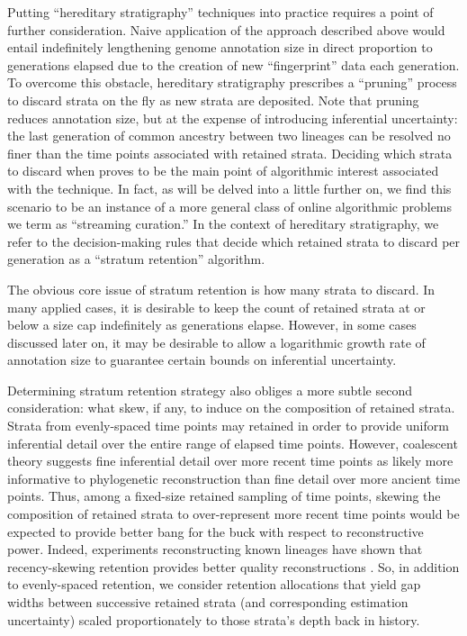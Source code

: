 Putting ``hereditary stratigraphy'' techniques into practice requires a point of further consideration.
Naive application of the approach described above would entail indefinitely lengthening genome annotation size in direct proportion to generations elapsed due to the creation of new ``fingerprint'' data each generation.
To overcome this obstacle, hereditary stratigraphy prescribes a ``pruning'' process to discard strata on the fly as new strata are deposited.
Note that pruning reduces annotation size, but at the expense of introducing inferential uncertainty: the last generation of common ancestry between two lineages can be resolved no finer than the time points associated with retained strata.
Deciding which strata to discard when proves to be the main point of algorithmic interest associated with the technique.
In fact, as will be delved into a little further on, we find this scenario to be an instance of a more general class of online algorithmic problems we term as ``streaming curation.''
In the context of hereditary stratigraphy, we refer to the decision-making rules that decide which retained strata to discard per generation as a ``stratum retention'' algorithm.

The obvious core issue of stratum retention is how many strata to discard.
In many applied cases, it is desirable to keep the count of retained strata at or below a size cap indefinitely as generations elapse.
However, in some cases discussed later on, it may be desirable to allow a logarithmic growth rate of annotation size to guarantee certain bounds on inferential uncertainty.

Determining stratum retention strategy also obliges a more subtle second consideration: what skew, if any, to induce on the composition of retained strata.
Strata from evenly-spaced time points may retained in order to provide uniform inferential detail over the entire range of elapsed time points.
However, coalescent theory suggests fine inferential detail over more recent time points as likely more informative to phylogenetic reconstruction than fine detail over more ancient time points.
Thus, among a fixed-size retained sampling of time points, skewing the composition of retained strata to over-represent more recent time points would be expected to provide better bang for the buck with respect to reconstructive power.
Indeed, experiments reconstructing known lineages have shown that recency-skewing retention provides better quality reconstructions \citep{moreno2022hereditary}.
So, in addition to evenly-spaced retention, we consider retention allocations that yield gap widths between successive retained strata (and corresponding estimation uncertainty) scaled proportionately to those strata's depth back in history.


